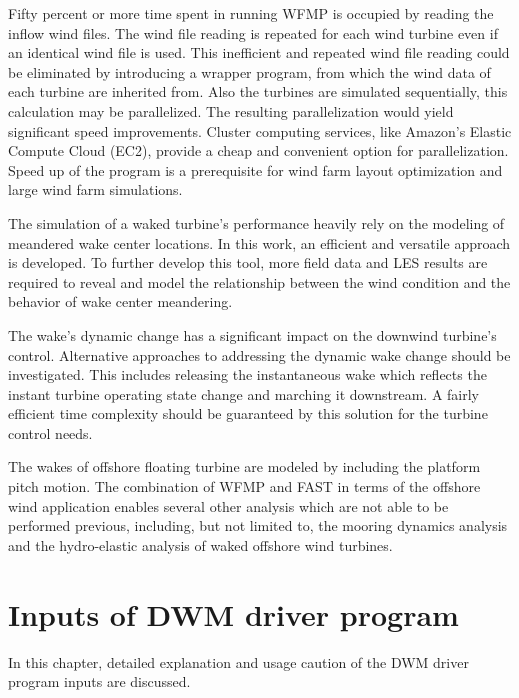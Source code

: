 \documentclass{umthesis}
\begin{document}
Fifty percent or more time spent in running WFMP is occupied by reading the inflow wind files. The wind file reading is repeated for each wind turbine even if an identical wind file is used. This inefficient and repeated wind file reading could be eliminated by introducing a wrapper program, from which the wind data of each turbine are inherited from. Also the turbines are simulated sequentially, this calculation may be parallelized. The resulting parallelization would yield significant speed improvements. Cluster computing services, like Amazon’s Elastic Compute Cloud (EC2), provide a cheap and convenient option for parallelization. Speed up of the program is a prerequisite for wind farm layout optimization and large wind farm simulations. 

The simulation of a waked turbine's performance heavily rely on the modeling of meandered wake center locations. In this work, an efficient and versatile approach is developed. To further develop this tool, more field data and LES results are required to reveal and model the relationship between the wind condition and the behavior of wake center meandering. 

The wake's dynamic change has a significant impact on the downwind turbine's control. Alternative approaches to addressing the dynamic wake change should be investigated. This includes releasing the instantaneous wake which reflects the instant turbine operating state change and marching it downstream. A fairly efficient time complexity should be guaranteed by this solution for the turbine control needs.

The wakes of offshore floating turbine are modeled by including the platform pitch motion. The combination of WFMP and FAST in terms of the offshore wind application enables several other analysis which are not able to be performed previous, including, but not limited to, the mooring dynamics analysis and the hydro-elastic analysis of waked offshore wind turbines.
  

\appendix
\chapter{Inputs of DWM driver program}
In this chapter, detailed explanation and usage caution of the DWM driver program inputs are discussed.\\
\end{document}
